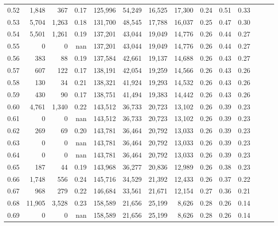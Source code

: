 \begin{tabular}{rrrrrrrrrrrrrr}
0.52 &   1,848 &    367 &  0.17 &  125,996 &   54,249 &  16,525 &  17,300 &  0.24 &  0.51 &      0.33 \\
0.53 &   5,704 &  1,263 &  0.18 &  131,700 &   48,545 &  17,788 &  16,037 &  0.25 &  0.47 &      0.30 \\
0.54 &   5,501 &  1,261 &  0.19 &  137,201 &   43,044 &  19,049 &  14,776 &  0.26 &  0.44 &      0.27 \\
0.55 &       0 &      0 &   nan &  137,201 &   43,044 &  19,049 &  14,776 &  0.26 &  0.44 &      0.27 \\
0.56 &     383 &     88 &  0.19 &  137,584 &   42,661 &  19,137 &  14,688 &  0.26 &  0.43 &      0.27 \\
0.57 &     607 &    122 &  0.17 &  138,191 &   42,054 &  19,259 &  14,566 &  0.26 &  0.43 &      0.26 \\
0.58 &     130 &     34 &  0.21 &  138,321 &   41,924 &  19,293 &  14,532 &  0.26 &  0.43 &      0.26 \\
0.59 &     430 &     90 &  0.17 &  138,751 &   41,494 &  19,383 &  14,442 &  0.26 &  0.43 &      0.26 \\
0.60 &   4,761 &  1,340 &  0.22 &  143,512 &   36,733 &  20,723 &  13,102 &  0.26 &  0.39 &      0.23 \\
0.61 &       0 &      0 &   nan &  143,512 &   36,733 &  20,723 &  13,102 &  0.26 &  0.39 &      0.23 \\
0.62 &     269 &     69 &  0.20 &  143,781 &   36,464 &  20,792 &  13,033 &  0.26 &  0.39 &      0.23 \\
0.63 &       0 &      0 &   nan &  143,781 &   36,464 &  20,792 &  13,033 &  0.26 &  0.39 &      0.23 \\
0.64 &       0 &      0 &   nan &  143,781 &   36,464 &  20,792 &  13,033 &  0.26 &  0.39 &      0.23 \\
0.65 &     187 &     44 &  0.19 &  143,968 &   36,277 &  20,836 &  12,989 &  0.26 &  0.38 &      0.23 \\
0.66 &   1,748 &    556 &  0.24 &  145,716 &   34,529 &  21,392 &  12,433 &  0.26 &  0.37 &      0.22 \\
0.67 &     968 &    279 &  0.22 &  146,684 &   33,561 &  21,671 &  12,154 &  0.27 &  0.36 &      0.21 \\
0.68 &  11,905 &  3,528 &  0.23 &  158,589 &   21,656 &  25,199 &   8,626 &  0.28 &  0.26 &      0.14 \\
0.69 &       0 &      0 &   nan &  158,589 &   21,656 &  25,199 &   8,626 &  0.28 &  0.26 &      0.14 \\

\end{tabular}
